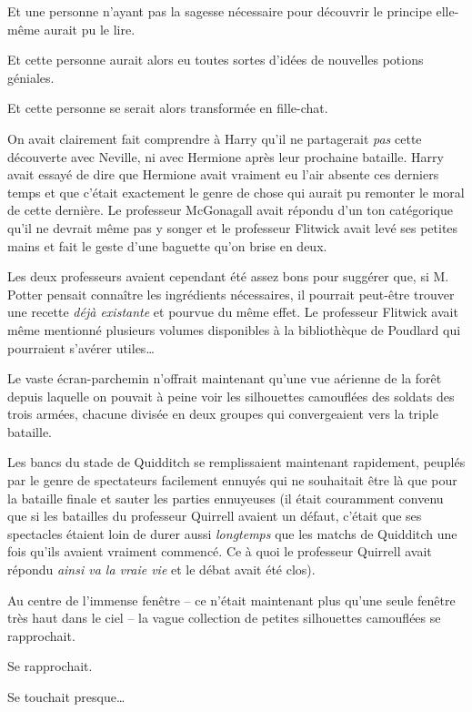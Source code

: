 Et une personne n'ayant pas la sagesse nécessaire pour découvrir le principe elle-même aurait pu le lire.

Et cette personne aurait alors eu toutes sortes d'idées de nouvelles potions géniales.

Et cette personne se serait alors transformée en fille-chat.

On avait clairement fait comprendre à Harry qu'il ne partagerait \emph{pas} cette découverte avec Neville, ni avec Hermione après leur prochaine bataille. Harry avait essayé de dire que Hermione avait vraiment eu l'air absente ces derniers temps et que c'était exactement le genre de chose qui aurait pu remonter le moral de cette dernière. Le professeur McGonagall avait répondu d'un ton catégorique qu'il ne devrait même pas y songer et le professeur Flitwick avait levé ses petites mains et fait le geste d'une baguette qu'on brise en deux.

Les deux professeurs avaient cependant été assez bons pour suggérer que, si M. Potter pensait connaître les ingrédients nécessaires, il pourrait peut-être trouver une recette \emph{déjà existante} et pourvue du même effet. Le professeur Flitwick avait même mentionné plusieurs volumes disponibles à la bibliothèque de Poudlard qui pourraient s'avérer utiles…

\later

Le vaste écran-parchemin n'offrait maintenant qu'une vue aérienne de la forêt depuis laquelle on pouvait à peine voir les silhouettes camouflées des soldats des trois armées, chacune divisée en deux groupes qui convergeaient vers la triple bataille.

Les bancs du stade de Quidditch se remplissaient maintenant rapidement, peuplés par le genre de spectateurs facilement ennuyés qui ne souhaitait être là que pour la bataille finale et sauter les parties ennuyeuses (il était couramment convenu que si les batailles du professeur Quirrell avaient un défaut, c'était que ses spectacles étaient loin de durer aussi \emph{longtemps} que les matchs de Quidditch une fois qu'ils avaient vraiment commencé. Ce à quoi le professeur Quirrell avait répondu \emph{ainsi va la vraie vie} et le débat avait été clos).

Au centre de l'immense fenêtre -- ce n'était maintenant plus qu'une seule fenêtre très haut dans le ciel -- la vague collection de petites silhouettes camouflées se rapprochait.

Se rapprochait.

Se touchait presque…

